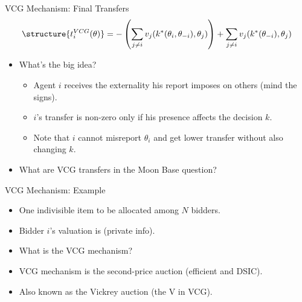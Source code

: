 \documentclass[english,10pt
,aspectratio=169
]{beamer}
\begin{document}
\begin{frame}{VCG Mechanism: Final Transfers}
\begin{align*}
\structure{ t_{i}^{VCG}(\theta) } = -\left(\sum_{j\neq i} v_{j}(k^*(\theta_i, \theta_{-i}), \theta_{j}) \right) + \sum_{j\neq i} v_{j}(k^*(\theta_{-i}), \theta_{j})
\end{align*}
\begin{itemize}
	\item What's the big idea?
	\begin{itemize}
		\item Agent $i$ receives the externality his report imposes on others (mind the signs).
		\item $i$'s transfer is non-zero only if his presence affects the decision $k$.
		\item Note that $i$ cannot misreport $\theta_i$ and get lower transfer without also changing $k$.
	\end{itemize}
	\item What are VCG transfers in the Moon Base question?
\end{itemize}
\end{frame}

\begin{frame}{VCG Mechanism: Example}
\begin{example}[Auction]
	\begin{itemize}
		\item One indivisible item to be allocated among $N$ bidders.
		\item Bidder $i$'s valuation is  (private info).
		\item What is the VCG mechanism?
	\end{itemize}
\end{example}
\begin{itemize}
	\item VCG mechanism is the second-price auction (efficient and DSIC).
	\item Also known as the Vickrey auction (the V in VCG).
\end{itemize}
\end{frame}
\end{document}
